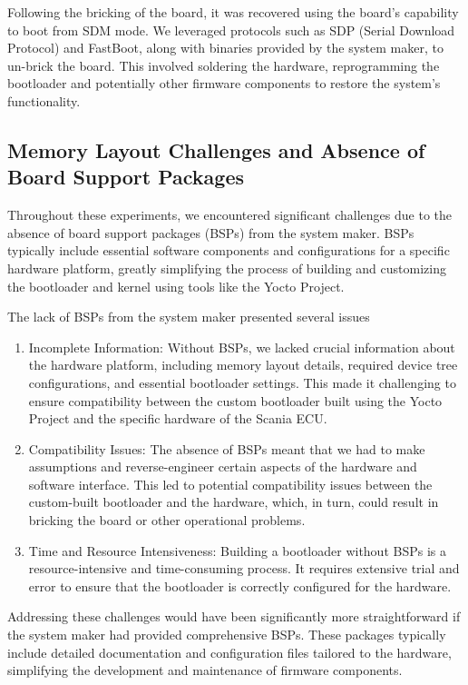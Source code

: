 Following the bricking of the board, it was recovered using the board's capability to boot from SDM mode. We leveraged protocols such as SDP (Serial Download Protocol) and FastBoot, along with binaries provided by the system maker, to un-brick the board. This involved soldering the hardware, reprogramming the bootloader and potentially other firmware components to restore the system's functionality.

\subsection{Memory Layout Challenges and Absence of Board Support Packages}

Throughout these experiments, we encountered significant challenges due to the absence of board support packages (BSPs) from the system maker. BSPs typically include essential software components and configurations for a specific hardware platform, greatly simplifying the process of building and customizing the bootloader and kernel using tools like the Yocto Project.

The lack of BSPs from the system maker presented several issues

\begin{enumerate}
	\item Incomplete Information: Without BSPs, we lacked crucial information about the hardware platform, including memory layout details, required device tree configurations, and essential bootloader settings. This made it challenging to ensure compatibility between the custom bootloader built using the Yocto Project and the specific hardware of the Scania ECU.
	\item Compatibility Issues: The absence of BSPs meant that we had to make assumptions and reverse-engineer certain aspects of the hardware and software interface. This led to potential compatibility issues between the custom-built bootloader and the hardware, which, in turn, could result in bricking the board or other operational problems.
	\item Time and Resource Intensiveness: Building a bootloader without BSPs is a resource-intensive and time-consuming process. It requires extensive trial and error to ensure that the bootloader is correctly configured for the hardware.
\end{enumerate}

Addressing these challenges would have been significantly more straightforward if the system maker had provided comprehensive BSPs. These packages typically include detailed documentation and configuration files tailored to the hardware, simplifying the development and maintenance of firmware components.